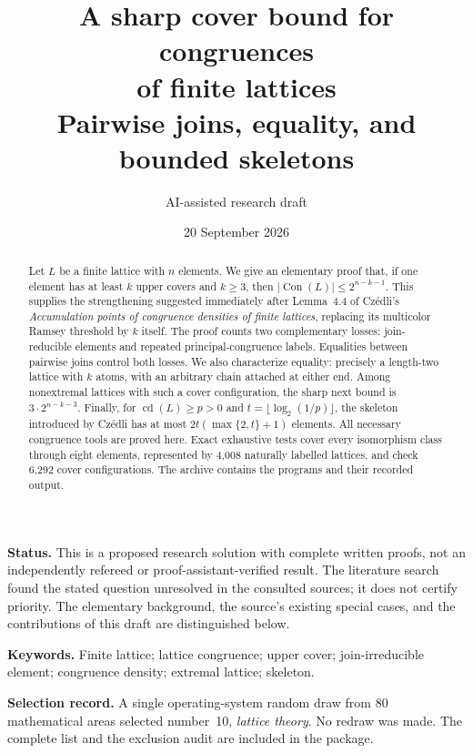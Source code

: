 \documentclass[11pt,a4paper]{article}
\title{\vspace{-1.0em}\LARGE\bfseries\color{Ink}
A sharp cover bound for congruences\nobreak\\[0.2em] of finite lattices\\[0.6em]
\large\normalfont\color{Accent}Pairwise joins, equality, and bounded skeletons}
\author{AI-assisted research draft}
\date{20 September 2026}
\numberwithin{equation}{section}
\theoremstyle{definition}
\theoremstyle{remark}
\DeclareMathOperator{\Con}{Con}
\DeclareMathOperator{\cdens}{cd}
\newcommand{\card}[1]{\lvert #1\rvert}
\begin{document}
\maketitle
\thispagestyle{empty}
\begin{abstract}
Let $L$ be a finite lattice with $n$ elements. We give an elementary proof that,
if one element has at least $k$ upper covers and $k\ge3$, then
$\card{\Con(L)}\le 2^{n-k-1}$. This supplies the strengthening suggested immediately
after Lemma~4.4 of Cz\'edli's \emph{Accumulation points of congruence densities of
finite lattices}, replacing its multicolor Ramsey threshold by $k$ itself.
The proof counts two complementary losses: join-reducible elements and repeated
principal-congruence labels. Equalities between pairwise joins control both losses.
We also characterize equality: precisely a length-two lattice with $k$ atoms,
with an arbitrary chain attached at either end. Among nonextremal lattices with
such a cover configuration, the sharp next bound is
$3\cdot 2^{n-k-3}$. Finally, for $\cdens(L)\ge p>0$ and
$t=\lfloor\log_2(1/p)\rfloor$, the skeleton introduced by Cz\'edli has at most
$2t(\max\{2,t\}+1)$ elements. All necessary congruence tools are proved here.
Exact exhaustive tests cover every isomorphism class through eight elements,
represented by 4,008 naturally labelled lattices, and check 6,292 cover
configurations. The archive contains the programs and their recorded output.
\end{abstract}

\medskip
\noindent\colorbox{Pale}{\parbox{\dimexpr\linewidth-2\fboxsep\relax}{%
\small\textbf{Status.} This is a proposed research solution with complete written
proofs, not an independently refereed or proof-assistant-verified result.
The literature search found the stated question unresolved in the consulted
sources; it does not certify priority. The elementary background, the source's
existing special cases, and the contributions of this draft are distinguished
below.}}

\medskip
\noindent\textbf{Keywords.} Finite lattice; lattice congruence; upper cover;
join-irreducible element; congruence density; extremal lattice; skeleton.

\noindent\textbf{Selection record.} A single operating-system random draw from
80 mathematical areas selected number~10, \emph{lattice theory}. No redraw was
made. The complete list and the exclusion audit are included in the package.

\clearpage
\tableofcontents
\clearpage
\end{document}
